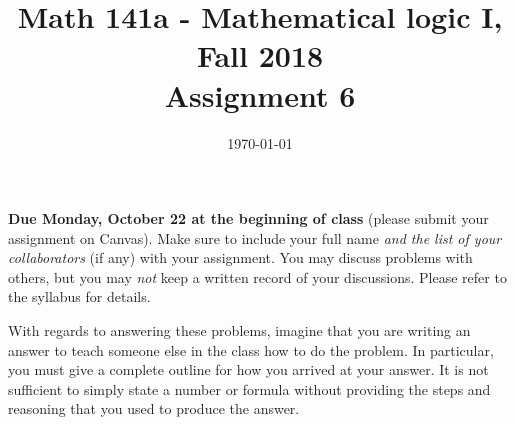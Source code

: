 \documentclass{amsart}
\title[Math 141a, Fall 2018: assignment 6]{Math 141a - Mathematical logic I, Fall 2018 \\ Assignment 6}
\date{\today}
\theoremstyle{definition}
\begin{document}

\maketitle

\textbf{Due Monday, October 22 at the beginning of class} (please submit your assignment on Canvas). Make sure to include your full name \emph{and the list of your collaborators} (if any) with your assignment. You may discuss problems with others, but you may \emph{not} keep a written record of your discussions. Please refer to the syllabus for details.

With regards to answering these problems, imagine that you are writing an answer to teach someone else in the class how to do the problem. In particular, you must give a complete outline for how you arrived at your answer. It is not sufficient to simply state a number or formula without providing the steps and reasoning that you used to produce the answer.
\end{document}
